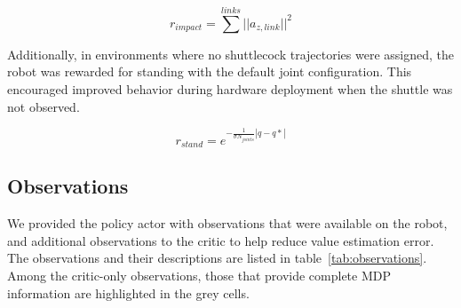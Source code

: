 \documentclass[9pt,twocolumn,twoside]{osajnl}
\begin{document}
\begin{equation}
    r_{impact} = \sum^{links} ||a_{z,link}||^2
\end{equation}

Additionally, in environments where no shuttlecock trajectories were assigned, the robot was rewarded for standing with the default joint configuration. This encouraged improved behavior during hardware deployment when the shuttle was not observed.

\begin{equation}
    r_{stand} = e^{-\frac{1}{\sigma N_{joints}}|q-q*|}
\end{equation}

\subsection*{Observations}


We provided the policy actor with observations that were available on the robot, and additional observations to the critic to help reduce value estimation error. The observations and their descriptions are listed in table~\ref{tab:observations}. Among the critic-only observations, those that provide complete \ac{MDP} information are highlighted in the grey cells.
\end{document}
